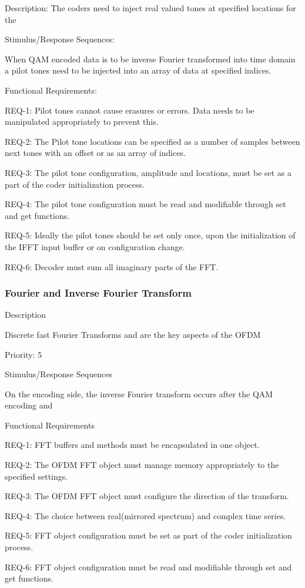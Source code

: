 \documentclass[]{report}
\begin{document}
Description:
The coders need to inject real valued tones at specified locations for the \par

Stimulus/Response Sequences: \par
When QAM encoded data is to be inverse Fourier transformed into time domain a pilot tones need to be injected into an array of data at specified indices. \par

Functional Requirements: \par

REQ-1: Pilot tones cannot cause erasures or errors. Data needs to be manipulated appropriately to prevent this. \par
REQ-2: The Pilot tone locations can be specified as a number of samples between next tones with an offset or as an array of indices. \par
REQ-3: The pilot tone configuration, amplitude and locations, must be set as a part of the coder initialization process. \par
REQ-4: The pilot tone configuration must be read and modifiable through set and get functions. \par
REQ-5: Ideally the pilot tones should be set only once, upon the initialization of the IFFT input buffer or on configuration change. \par
REQ-6: Decoder must sum all imaginary parts of the FFT. \par


\subsubsection{Fourier and Inverse Fourier Transform}

Description \par
Discrete fast Fourier Transforms and are the key aspects of the OFDM \par

Priority: 5

Stimulus/Response Sequences \par
On the encoding side, the inverse Fourier transform occurs after the QAM encoding and  \par

Functional Requirements \par 

REQ-1: FFT buffers and methods must be encapsulated in one object.  \par
REQ-2: The OFDM FFT object must manage memory appropriately to the specified settings. \par
REQ-3: The OFDM FFT object must configure the direction of the transform.  \par
REQ-4: The choice between real(mirrored spectrum) and complex time series. \par
REQ-5: FFT object configuration must be set as part of the coder initialization process. \par
REQ-6: FFT object configuration must be read and modifiable through set and get functions. \par
\end{document}
